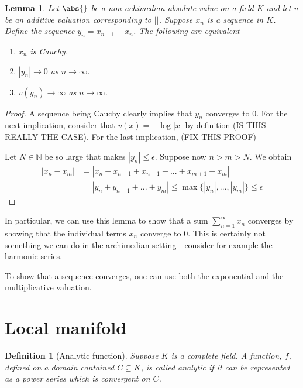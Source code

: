 \documentclass{article}
\newtheorem{definition}{Definition}[section]
\newtheorem{lemma}{Lemma}[section]
\newcommand{\mbb}[1]{\mathbb{#1}}
\begin{document}
\begin{lemma} \label{lem:SufficientConditionForConvergence}
    Let $\abs{}$ be a non-achimedian absolute value on a field $K$ and let $v$ be an additive valuation corresponding to $||$. Suppose $x_n$ is a sequence in $K$. Define the sequence $y_n = x_{n+1} - x_{n}$. The following are equivalent
    \begin{enumerate}
        \item $x_n$ is Cauchy.
        \item $|y_n| \to 0$ as $n \to \infty$.
        \item $v(y_n) \to \infty$ as $n \to \infty$.
    \end{enumerate}
\end{lemma}
\begin{proof}
    A sequence being Cauchy clearly implies that $y_n$ converges to 0. For the next implication, consider that $v(x) = - \log |x|$ by definition (IS THIS REALLY THE CASE). For the last implication, (FIX THIS PROOF)
    
    Let $N \in \mbb N$ be so large that makes $|y_n| \leq \epsilon$. Suppose now $n > m > N$. We obtain
    \begin{align*}
        |x_n - x_m| &= |x_n - x_{n-1} + x_{n-1} - ... + x_{m+1} - x_{m}| \\ 
        &= |y_n + y_{n-1} + ... + y_{m}| \leq \max \{|y_n|, ..., |y_m|  \} \leq \epsilon
    \end{align*}
\end{proof}

In particular, we can use this lemma to show that a sum $\sum_{n=1}^\infty x_n$ converges by showing that the individual terms $x_n$ converge to 0. This is certainly not something we can do in the archimedian setting - consider for example the harmonic series. 


To show that a sequence converges, one can use both the exponential and the multiplicative valuation. 



\section{Local manifold}

\begin{definition}[Analytic function]
    Suppose $K$ is a complete field. A function, $f$, defined on a domain contained $C \subseteq K$, is called analytic if it can be represented as a power series which is convergent on $C$.
\end{definition}
\end{document}
